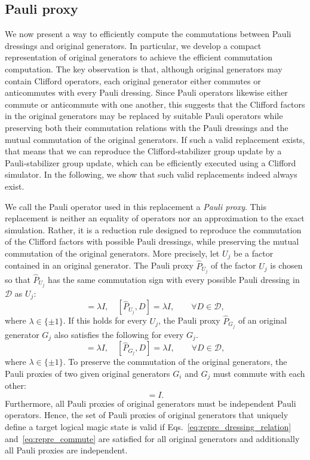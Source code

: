 \documentclass[
 reprint,
 amsmath,amssymb,
 pra,superscriptaddress, nofootinbib
]{revtex4-2}
\theoremstyle{definition}
\theoremstyle{plain}
\begin{document}
\subsection{Pauli proxy}
We now present a way to efficiently compute the commutations between Pauli dressings and original generators.
In particular, we develop a compact representation of original generators to achieve the efficient commutation computation.
The key observation is that, although original generators may contain Clifford operators, each original generator either commutes or anticommutes with every Pauli dressing.
Since Pauli operators likewise either commute or anticommute with one another, this suggests that the Clifford factors in the original generators may be replaced by suitable Pauli operators while preserving both their commutation relations with the Pauli dressings and the mutual commutation of the original generators.
If such a valid replacement exists, that means that we can reproduce the Clifford-stabilizer group update by a Pauli-stabilizer group update, which can be efficiently executed using a Clifford simulator. 
In the following, we show that such valid replacements indeed always exist. 

We call the Pauli operator used in this replacement a \emph{Pauli
proxy}. 
This replacement is neither an equality of operators nor an approximation to the exact simulation. Rather, it is a reduction rule designed to reproduce the commutation of the Clifford factors with possible Pauli dressings, while preserving the mutual commutation of the original generators.
More precisely, let $U_j$ be a factor contained in an original generator.
The Pauli proxy $\hat{P}_{U_j}$ of the factor $U_j$ is chosen so that $\hat{P}_{U_j}$ has the same commutation sign with every possible Pauli dressing in $\mathcal{D}$ as $U_j$:
\begin{equation}
  [U_j, D] = \lambda I, \quad [\hat{P}_{U_j}, D] = \lambda I, \qquad \forall D \in  \mathcal{D},
\end{equation}
where $\lambda \in \{\pm 1 \}$.
If this holds for every $U_j$, the Pauli proxy $\hat{P}_{G_j}$ of an original generator $G_j$ also satisfies the following for every $G_j$.
\begin{equation}
  [G_j, D] = \lambda I, \quad [\hat{P}_{G_j}, D] = \lambda I, \qquad \forall D \in  \mathcal{D},
  \label{eq:repre_dressing_relation}
\end{equation}
where $\lambda \in \{\pm 1 \}$.
To preserve the commutation of the original generators, the Pauli proxies of two given original generators $G_i$ and $G_j$ must commute with each other:
\begin{equation}
  [\hat{P}_{G_i},\hat{P}_{G_j}]=I.
  \label{eq:repre_commute}
\end{equation}
Furthermore, all Pauli proxies of original generators must be independent Pauli operators.
Hence, the set of Pauli proxies of original generators that uniquely define a target logical magic state is valid if Eqs.~\eqref{eq:repre_dressing_relation} and~\eqref{eq:repre_commute} are satisfied for all original generators and additionally all Pauli proxies are independent.
\end{document}
